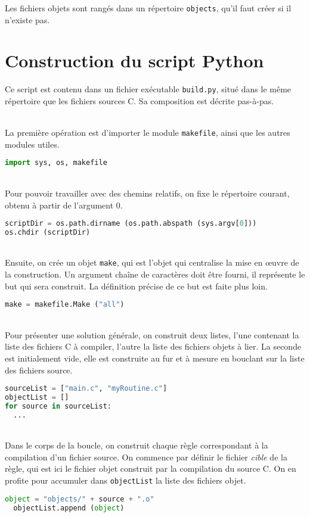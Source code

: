 \documentclass[a4paper,11pt]{extarticle}
\begin{document}
Les fichiers objets sont rangés dans un répertoire \texttt{objects}, qu'il faut créer si il n'existe pas.


\section{Construction du script Python}

Ce script est contenu dans un fichier exécutable \texttt{build.py}, situé dans le même répertoire que les fichiers sources C. Sa composition est décrite pas-à-pas.

~\\La première opération est d'importer le module \texttt{makefile}, ainsi que les autres modules utiles.
\begin{lstlisting}[language=py]
import sys, os, makefile
\end{lstlisting}

~\\Pour pouvoir travailler avec des chemins relatifs, on fixe le répertoire courant, obtenu à partir de l'argument $0$.
\begin{lstlisting}[language=py]
scriptDir = os.path.dirname (os.path.abspath (sys.argv[0]))
os.chdir (scriptDir)
\end{lstlisting}

~\\Ensuite, on crée un objet \texttt{make}, qui est l'objet qui centralise la mise en œuvre de la construction. Un argument chaîne de caractères doit être fourni, il représente le but qui sera construit. La définition précise de ce but est faite plus loin.
\begin{lstlisting}[language=py]
make = makefile.Make ("all")
\end{lstlisting}

~\\Pour présenter une solution générale, on construit deux listes, l'une contenant la liste des fichiers C à compiler, l'autre la liste des fichiers objets à lier. La seconde est initialement vide, elle est construite au fur et à mesure en bouclant sur la liste des fichiers source. 
\begin{lstlisting}[language=py]
sourceList = ["main.c", "myRoutine.c"]
objectList = []
for source in sourceList:
  ...
\end{lstlisting}

~\\Dans le corps de la boucle, on construit chaque règle correspondant à la compilation d'un fichier source. On commence par définir le fichier \emph{cible} de la règle, qui est ici le fichier objet construit par la compilation du source C. On en profite pour accumuler dans \texttt{objectList} la liste des fichiers objet.
\begin{lstlisting}[language=py]
  object = "objects/" + source + ".o"
  objectList.append (object)
\end{lstlisting}
\end{document}
